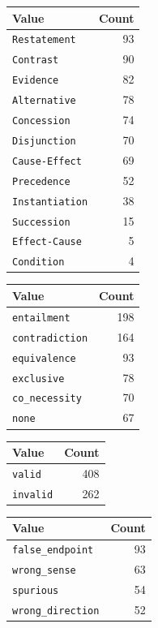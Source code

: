 \documentclass[11pt]{article}
\begin{document}
\begin{minipage}[t]{0.48\linewidth}
\centering
\small
{}
\label{tab:senses}
\begin{tabular}{lr}
\toprule
Value & Count \\
\midrule
\texttt{Restatement} & 93 \\
\texttt{Contrast} & 90 \\
\texttt{Evidence} & 82 \\
\texttt{Alternative} & 78 \\
\texttt{Concession} & 74 \\
\texttt{Disjunction} & 70 \\
\texttt{Cause-Effect} & 69 \\
\texttt{Precedence} & 52 \\
\texttt{Instantiation} & 38 \\
\texttt{Succession} & 15 \\
\texttt{Effect-Cause} & 5 \\
\texttt{Condition} & 4 \\
\bottomrule
\end{tabular}
\end{minipage}\hfill\begin{minipage}[t]{0.48\linewidth}
\centering
\small
{}
\label{tab:couplings}
\begin{tabular}{lr}
\toprule
Value & Count \\
\midrule
\texttt{entailment} & 198 \\
\texttt{contradiction} & 164 \\
\texttt{equivalence} & 93 \\
\texttt{exclusive} & 78 \\
\texttt{co\_necessity} & 70 \\
\texttt{none} & 67 \\
\bottomrule
\end{tabular}
\end{minipage}

\bigskip
\begin{minipage}[t]{0.48\linewidth}
\centering
\small
{}
\label{tab:validity}
\begin{tabular}{lr}
\toprule
Value & Count \\
\midrule
\texttt{valid} & 408 \\
\texttt{invalid} & 262 \\
\bottomrule
\end{tabular}
\end{minipage}\hfill\begin{minipage}[t]{0.48\linewidth}
\centering
\small
{}
\label{tab:errorkinds}
\begin{tabular}{lr}
\toprule
Value & Count \\
\midrule
\texttt{false\_endpoint} & 93 \\
\texttt{wrong\_sense} & 63 \\
\texttt{spurious} & 54 \\
\texttt{wrong\_direction} & 52 \\
\bottomrule
\end{tabular}
\end{minipage}
\end{document}
